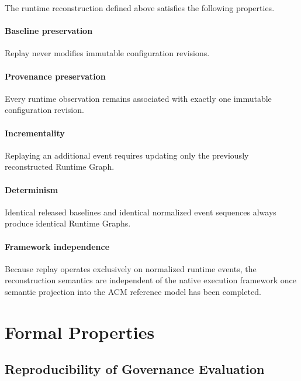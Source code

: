 \documentclass[10pt]{article}
\begin{document}
The runtime reconstruction defined above satisfies the following properties.

\paragraph*{Baseline preservation}

Replay never modifies immutable configuration revisions.

\paragraph*{Provenance preservation}

Every runtime observation remains associated with exactly one immutable
configuration revision.

\paragraph*{Incrementality}

Replaying an additional event requires updating only the previously
reconstructed Runtime Graph.

\paragraph*{Determinism}

Identical released baselines and identical normalized event sequences always
produce identical Runtime Graphs.

\paragraph*{Framework independence}

Because replay operates exclusively on normalized runtime events, the
reconstruction semantics are independent of the native execution framework once
semantic projection into the ACM reference model has been completed.

\section{Formal Properties}
\label{appendix:formal_properties}

\subsection{Reproducibility of Governance Evaluation}
\label{appendix:governance_reproducibility}
\end{document}
